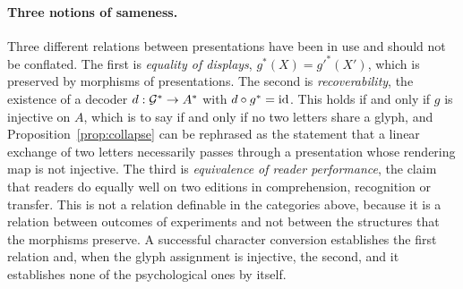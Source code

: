 \paragraph{Three notions of sameness.}
Three different relations between presentations have been in use and should not be conflated. The first is \emph{equality of displays}, $g^{*}(X)=g'^{*}(X')$, which is preserved by morphisms of presentations. The second is \emph{recoverability}, the existence of a decoder $d:\mathcal{G}^{*}\to A^{*}$ with $d\circ g^{*}=\mathrm{id}$. This holds if and only if $g$ is injective on $A$, which is to say if and only if no two letters share a glyph, and Proposition~\ref{prop:collapse} can be rephrased as the statement that a linear exchange of two letters necessarily passes through a presentation whose rendering map is not injective. The third is \emph{equivalence of reader performance}, the claim that readers do equally well on two editions in comprehension, recognition or transfer. This is not a relation definable in the categories above, because it is a relation between outcomes of experiments and not between the structures that the morphisms preserve. A successful character conversion establishes the first relation and, when the glyph assignment is injective, the second, and it establishes none of the psychological ones by itself.

